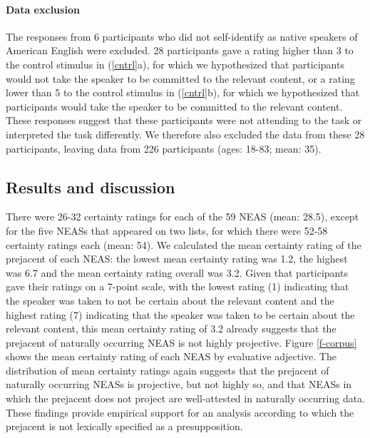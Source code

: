 \documentclass[11pt,fleqn]{article}
\newcommand{\6}{\mbox{$[\hspace*{-.6mm}[$}}
\newcommand{\9}{\mbox{$]\hspace*{-.6mm}]$}}
\begin{document}
\paragraph{Data exclusion} The responses from 6 participants who did not self-identify as native speakers of American English were excluded. 28 participants gave a rating higher than 3 to the control stimulus in (\ref{cntrl}a), for which we hypothesized that participants would not take the speaker to be committed to the relevant content, or a rating lower than 5 to the control stimulus in (\ref{cntrl}b), for which we hypothesized that participants would take the speaker to be committed to the relevant content. These responses suggest that these participants were not attending to the task or interpreted the task differently. We therefore also excluded the data from these 28 participants, leaving data from 226 participants (ages: 18-83; mean: 35).

\subsection{Results and discussion}

There were 26-32 certainty ratings for each of the 59 NEAS (mean: 28.5), except for the five NEASs that appeared on two lists, for which there were 52-58 certainty ratings each (mean: 54). We calculated the mean certainty rating of the prejacent of each NEAS: the lowest mean certainty rating was 1.2, the highest was 6.7 and the mean certainty rating overall was 3.2. Given that participants gave their ratings on a 7-point scale, with the lowest rating (1) indicating that the speaker was taken to not be certain about the relevant content and the highest rating (7) indicating that the speaker was taken to be certain about the relevant content, this mean certainty rating of 3.2 already suggests that the prejacent of naturally occurring NEAS is not highly projective. Figure \ref{f-corpus} shows the mean certainty rating of each NEAS by evaluative adjective. The distribution of mean certainty ratings again suggests that the prejacent of naturally occurring NEASs is projective, but not highly so, and that NEASs in which the prejacent does not project are well-attested in naturally occurring data. These findings provide empirical support for an analysis according to which the prejacent is not lexically specified as a presupposition. 
\end{document}
